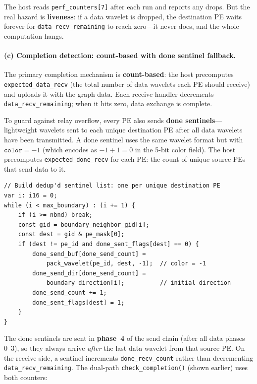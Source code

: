 \documentclass[11pt,letterpaper]{article}
\begin{document}
The host reads \texttt{perf\_counters[7]} after each run and reports any drops. But the real hazard is \textbf{liveness}: if a data wavelet is dropped, the destination PE waits forever for \texttt{data\_recv\_remaining} to reach zero---it never does, and the whole computation hangs.

\paragraph{(c) Completion detection: count-based with done sentinel fallback.}

The primary completion mechanism is \textbf{count-based}: the host precomputes \texttt{expected\_data\_recv} (the total number of data wavelets each PE should receive) and uploads it with the graph data. Each receive handler decrements \texttt{data\_recv\_remaining}; when it hits zero, data exchange is complete.

To guard against relay overflow, every PE also sends \textbf{done sentinels}---lightweight wavelets sent to each unique destination PE after all data wavelets have been transmitted. A done sentinel uses the same wavelet format but with $\texttt{color} = -1$ (which encodes as $-1+1=0$ in the 5-bit color field). The host precomputes \texttt{expected\_done\_recv} for each PE: the count of unique source PEs that send data to it.

\begin{lstlisting}[language=CSL, numbers=none, caption={Done sentinel construction (from \texttt{send\_boundary})}]
// Build dedup'd sentinel list: one per unique destination PE
var i: i16 = 0;
while (i < max_boundary) : (i += 1) {
    if (i >= nbnd) break;
    const gid = boundary_neighbor_gid[i];
    const dest = gid & pe_mask[0];
    if (dest != pe_id and done_sent_flags[dest] == 0) {
        done_send_buf[done_send_count] =
            pack_wavelet(pe_id, dest, -1);  // color = -1
        done_send_dir[done_send_count] =
            boundary_direction[i];          // initial direction
        done_send_count += 1;
        done_sent_flags[dest] = 1;
    }
}
\end{lstlisting}

The done sentinels are sent in \textbf{phase~4} of the send chain (after all data phases 0--3), so they always arrive \emph{after} the last data wavelet from that source PE. On the receive side, a sentinel increments \texttt{done\_recv\_count} rather than decrementing \texttt{data\_recv\_remaining}. The dual-path \texttt{check\_completion()} (shown earlier) uses both counters:
\end{document}
